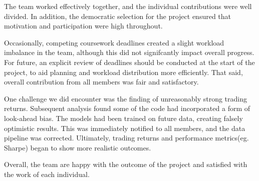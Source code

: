 \documentclass[11pt, a4paper]{article}
\begin{document}
The team worked effectively together, and the individual contributions were well divided. In addition, the democratic selection for the project ensured that motivation and participation were high throughout.

Occasionally, competing coursework deadlines created a slight workload imbalance in the team, although this did not signifcantly impact overall progress. For future, an explicit review of deadlines should be conducted at the start of the project, to aid planning and workload distribution more efficiently.
That said, overall contribution from all members was fair and satisfactory.

One challenge we did encounter was the finding of unreasonably strong trading returns. Subsequent analysis found some of the code had incorporated a form of look-ahead bias. The models had been trained on future data, creating falsely optimistic results. This was immediately notified to all members, and the data pipeline was corrected. Ultimately, trading returns and performance metrics(eg. Sharpe) began to show more realistic outcomes.

Overall, the team are happy with the outcome of the project and satisfied with the work of each individual.
\end{document}
